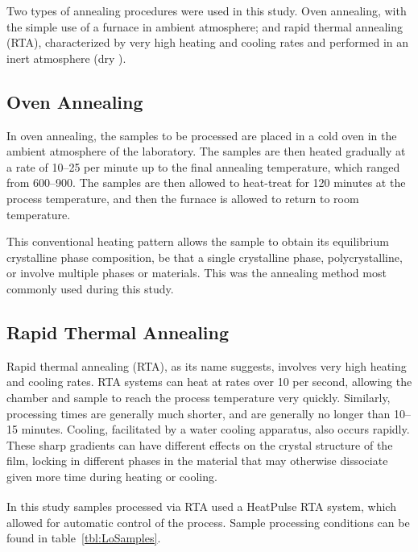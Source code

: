 Two types of annealing procedures were used in this study. Oven annealing, with the simple use of a furnace in ambient atmosphere; and rapid thermal annealing (RTA), characterized by very high heating and cooling rates and performed in an inert atmosphere (dry ). 



\subsection{Oven Annealing}

In oven annealing, the samples to be processed are placed in a cold oven in the ambient atmosphere of the laboratory. The samples are then heated gradually at a rate of 10--25\degC{} per minute up to the final annealing temperature, which ranged from 600--900\degC{}. The samples are then allowed to heat-treat for 120 minutes at the process temperature, and then the furnace is allowed to return to room temperature. 

This conventional heating pattern allows the sample to obtain its equilibrium crystalline phase composition, be that a single crystalline phase, polycrystalline, or involve multiple phases or materials. This was the annealing method most commonly used during this study. 


\subsection{Rapid Thermal Annealing}

Rapid thermal annealing (RTA), as its name suggests, involves very high heating and cooling rates. RTA systems can heat at rates over 10\degC{} per second, allowing the chamber and sample to reach the process temperature very quickly. Similarly, processing times are generally much shorter, and are generally no longer than 10--15 minutes. Cooling, facilitated by a water cooling apparatus, also occurs rapidly. These sharp gradients can have different effects on the crystal structure of the film, locking in different phases in the material that may otherwise dissociate given more time during heating or cooling. 

In this study samples processed via RTA used a HeatPulse\textsuperscript{\texttrademark} RTA system, which allowed for automatic control of the process. Sample processing conditions can be found in table~\vref{tbl:LoSamples}. 





